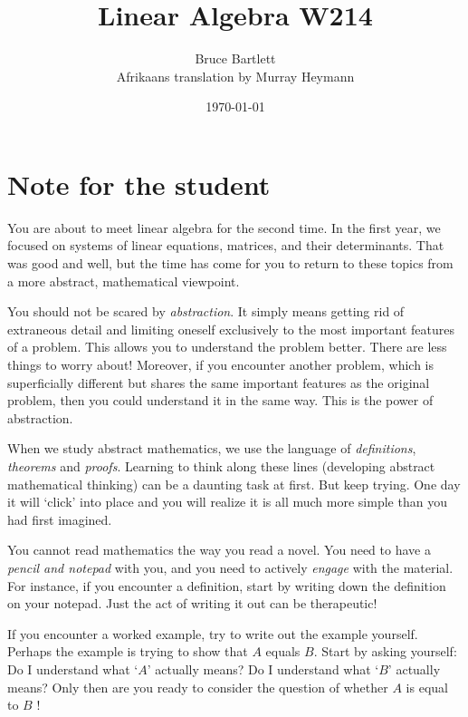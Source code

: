 \documentclass[a4paper,11pt]{book}
\theoremstyle{definition}
\begin{document}
\frontmatter


\author{{\Large Bruce Bartlett}  \\ {\large Afrikaans translation by Murray Heymann}}
\title{Linear Algebra W214}
\date{\today}



\maketitle

\setcounter{tocdepth}{1}
\tableofcontents



\chapter{Note for the student} \label{Ch0NoteForStudent}

You are about to meet linear algebra for the second time. In the first year, we focused on systems of linear equations, matrices, and their determinants. That was good and well, but the time has come for you to return to these topics from a more abstract, mathematical viewpoint. 

You should not be scared by {\em abstraction}. It simply means getting rid of extraneous detail and limiting oneself exclusively to the most important features of a problem. This allows you to understand the problem better. There are less things to worry about! Moreover, if you encounter another problem, which is superficially different but shares the same important features as the original problem, then you could understand it in the same way. This is the power of abstraction.

When we study abstract mathematics, we use the language of {\em definitions}, {\em theorems} and {\em proofs}. Learning to think along these lines (developing abstract mathematical thinking) can be a daunting task at first. But keep trying. One day it will `click' into place and you will realize it is all much more simple than you had first imagined. 

You cannot read mathematics the way you read a novel. You need to have a {\em pencil and notepad} with you, and you need to actively {\em engage} with the material. For instance, if you encounter a definition, start by writing down the definition on your notepad. Just the act of writing it out can be therapeutic! 

If you encounter a worked example, try to write out the example yourself. Perhaps the example is trying to show that $A$ equals $B$. Start by asking yourself: Do I understand what `$A$' actually means? Do I understand what `$B$' actually means? Only then are you ready to consider the question of whether $A$ is equal to $B$ !
\end{document}
